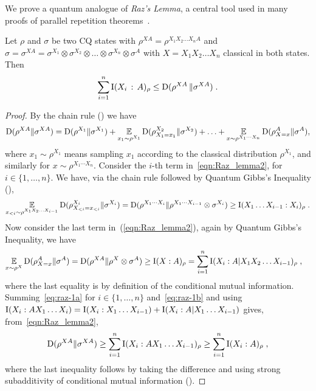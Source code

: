 We prove a quantum analogue of \emph{Raz's Lemma}, a central tool used in many proofs of parallel repetition theorems~\cite{raz1998parallel, Hol09,barak2009strong}. 

\begin{lemma}
\label{lem:quantum_raz}
Let $\rho$ and $\sigma$ be two CQ states with  $\rho^{XA}= \rho^{X_1 X_2 \ldots X_n A}$ and $\sigma= \sigma^{XA}= \sigma^{X_1}\otimes \sigma^{X_2}\otimes \ldots \otimes \sigma^{X_n} \otimes \sigma^A$ with $X=X_1 X_2 \ldots X_n$ classical in both states. Then
\begin{equation}\label{eqn:Raz_lemma1} \sum_{i=1}^n \mathrm{I}(X_i \, :\, A)_\rho \leq \mathrm{D}(\rho^{XA} \, \| \sigma^{XA})\;. \end{equation}
\end{lemma}

\begin{proof}
By the chain rule () we have 
\begin{equation}\label{eqn:Raz_lemma2}
\mathrm{D}(\rho^{XA} \| \sigma^{XA})= \mathrm{D}(\rho^{X_1} \| \sigma^{X_1}) + \operatorname*{\mathbb{E}}_{x_1 \sim \rho^{X_1}} \mathrm{D}(\rho^{X_2}_{X_1=x_1}\| \sigma^{X_2}) + \ldots+ \operatorname*{\mathbb{E}}_{x \sim \rho^{X_1 \cdots X_n}} \mathrm{D}(\rho^{A}_{X=x} \| \sigma^{A}),
\end{equation}
where $x_1 \sim \rho^{X_1}$ means sampling $x_1$ according to the classical distribution $\rho^{X_1}$, and similarly for $x \sim \rho^{X_1 \cdots X_n}$. Consider the $i$-th term in~\eqref{eqn:Raz_lemma2}, for $i\in\{1,\ldots,n\}$. We have, via the chain rule followed by Quantum Gibbs's Inequality (), 
\begin{equation}\label{eq:raz-1a}
\operatorname*{\mathbb{E}}_{x_{<i}\sim \rho^{X_1X_2\ldots X_{i-1}}} \mathrm{D}(\rho^{X_i}_{X_{< i}= x_{<i}} \| \sigma^{X_i}) = \mathrm{D}(\rho^{X_1 \cdots X_i} \|\rho^{X_1 \cdots X_{i-1}} \otimes \sigma^{X_i}) \geq  \mathrm{I}(X_1\ldots X_{i-1} : X_i)_\rho\;.
\end{equation}
Now consider the last term in~(\ref{eqn:Raz_lemma2}), again by Quantum Gibbs's Inequality, we have
\begin{align}
\operatorname*{\mathbb{E}}_{x\sim \rho^X} \mathrm{D}(\rho^{A}_{X=x} \|\sigma^{A}) &= \mathrm{D}(\rho^{XA} \| \rho^X \otimes \sigma^A) \geq \mathrm{I}(X:A)_\rho = \sum_{i=1}^n \mathrm{I}(X_i : A| X_1 X_2 \ldots X_{i-1})_\rho\;,\label{eq:raz-1b}
\end{align}
where the last equality is by definition of the conditional mutual information. 
Summing~\eqref{eq:raz-1a} for $i\in\{1,\ldots,n\}$ and~\eqref{eq:raz-1b} and using $\mathrm{I}(X_i:A X_1\ldots X_i)= \mathrm{I}(X_i:X_1\ldots X_{i-1})+ \mathrm{I}(X_i:A|X_1\ldots X_{i-1})$ gives, from~\eqref{eqn:Raz_lemma2},
\[ \mathrm{D}(\rho^{X A} \| \sigma^{XA})\geq \sum_{i=1}^n \mathrm{I}(X_i: A X_1 \ldots X_{i-1})_\rho \geq \sum_{i=1}^n \mathrm{I}(X_i:A)_\rho\;,
\]
where the last inequality follows by taking the difference and using strong subadditivity of conditional mutual information (). 
\end{proof}

